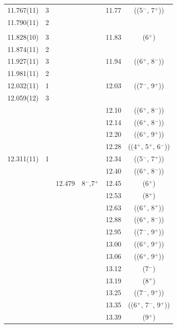 {\begin{center}
\begin{longtable}{cc cc cc}
   11.767(11)     & 3 &   &   & 11.77 & ((5$^-$, 7$^+$))          \\
   11.790(11)     & 2 &   &   &   &                           \\
  &   &   &   &   &                           \\
   11.828(10)     & 3 &   &   & 11.83 & (6$^+$)                   \\
     11.874(11)   & 2 &   &   &   &                           \\
    11.927(11)    & 3 &   &   & 11.94 & ((6$^+$, 8$^-$))          \\
    11.981(11)    & 2 &   &   &   &                           \\
     12.032(11)   & 1 &   &   & 12.03 & ((7$^-$, 9$^+$))          \\
     12.059(12)   & 3 &   &   &   &                           \\
  &   &   &   & 12.10 & ((6$^+$, 8$^-$))          \\
  &   &   &   & 12.14 & ((6$^+$, 8$^-$))          \\
  &   &   &   & 12.20 & ((6$^+$, 9$^+$))          \\
  &   &   &   & 12.28 & ((4$^+$, 5$^+$, 6$^-$))   \\
    12.311(11)    & 1 &   &   & 12.34 & ((5$^-$, 7$^+$))          \\
  &   &   &   & 12.40 & ((6$^+$, 8$^-$))          \\
  &   & 12.479  & 8$^-$,7$^+$ & 12.45 & (6$^+$)                   \\
  &   &   &   & 12.53 & (8$^+$)                   \\
  &   &   &   & 12.63 & ((6$^+$, 8$^+$))          \\
  &   &   &   & 12.88 & ((6$^+$, 8$^-$))          \\
  &   &   &   & 12.95 & ((7$^-$, 9$^+$))          \\
  &   &   &   & 13.00 & ((6$^+$, 9$^+$))          \\
  &   &   &   & 13.06 & ((6$^+$, 9$^+$))          \\
  &   &   &   & 13.12 & (7$^-$)                   \\
  &   &   &   & 13.19 & (8$^+$)                   \\
  &   &   &   & 13.25 & ((7$^-$, 9$^+$))          \\
  &   &   &   & 13.35 & ((6$^+$, 7$^-$, 9$^+$))   \\
  &   &   &   & 13.39 & (9$^+$)                   \\

\end{longtable}
\end{center}}
